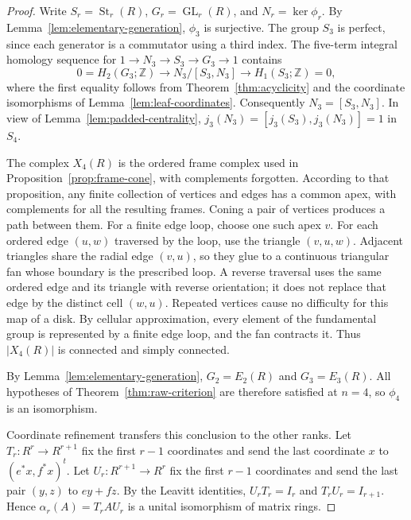 \documentclass[11pt]{amsart}
\newcommand{\Z}{\mathbb Z}
\DeclareMathOperator{\GL}{GL}
\DeclareMathOperator{\St}{St}
\theoremstyle{definition}
\theoremstyle{remark}
\numberwithin{equation}{section}
\begin{document}
\begin{proof}
Write $S_r=\St_r(R)$, $G_r=\GL_r(R)$, and $N_r=\ker\phi_r$. By Lemma~\ref{lem:elementary-generation}, $\phi_3$ is surjective. The group $S_3$ is perfect, since each generator is a commutator using a third index. The five-term integral homology sequence for $1\to N_3\to S_3\to G_3\to1$ contains
$$
0=H_2(G_3;\Z)\longrightarrow N_3/[S_3,N_3] \longrightarrow H_1(S_3;\Z)=0,
$$
where the first equality follows from Theorem~\ref{thm:acyclicity} and the coordinate isomorphisms of Lemma~\ref{lem:leaf-coordinates}. Consequently $N_3=[S_3,N_3]$. In view of Lemma~\ref{lem:padded-centrality}, $j_3(N_3)=[j_3(S_3),j_3(N_3)]=1$ in $S_4$.

The complex $X_4(R)$ is the ordered frame complex used in Proposition~\ref{prop:frame-cone}, with complements forgotten. According to that proposition, any finite collection of vertices and edges has a common apex, with complements for all the resulting frames. Coning a pair of vertices produces a path between them. For a finite edge loop, choose one such apex $v$. For each ordered edge $(u,w)$ traversed by the loop, use the triangle $(v,u,w)$. Adjacent triangles share the radial edge $(v,u)$, so they glue to a continuous triangular fan whose boundary is the prescribed loop. A reverse traversal uses the same ordered edge and its triangle with reverse orientation; it does not replace that edge by the distinct cell $(w,u)$. Repeated vertices cause no difficulty for this map of a disk. By cellular approximation, every element of the fundamental group is represented by a finite edge loop, and the fan contracts it. Thus $|X_4(R)|$ is connected and simply connected.

By Lemma~\ref{lem:elementary-generation}, $G_2=E_2(R)$ and $G_3=E_3(R)$. All hypotheses of Theorem~\ref{thm:raw-criterion} are therefore satisfied at $n=4$, so $\phi_4$ is an isomorphism.

Coordinate refinement transfers this conclusion to the other ranks. Let $T_r:R^r\to R^{r+1}$ fix the first $r-1$ coordinates and send the last coordinate $x$ to $(e^*x,f^*x)^t$. Let $U_r:R^{r+1}\to R^r$ fix the first $r-1$ coordinates and send the last pair $(y,z)$ to $ey+fz$. By the Leavitt identities, $U_rT_r=I_r$ and $T_rU_r=I_{r+1}$. Hence $\alpha_r(A)=T_rAU_r$ is a unital isomorphism of matrix rings.


\end{proof}
\end{document}

